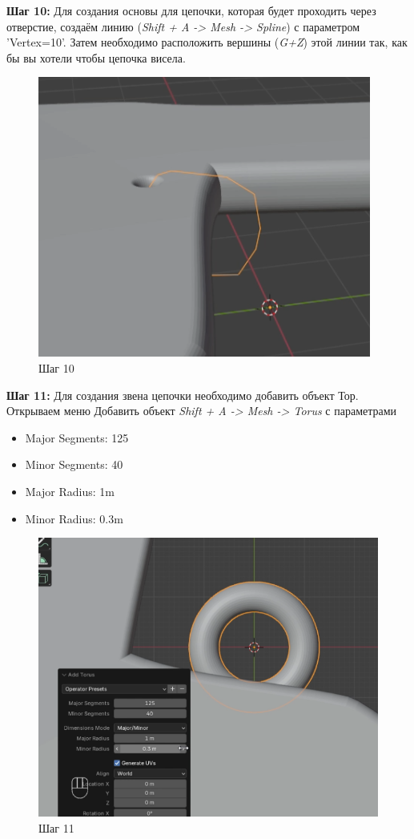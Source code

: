 \documentclass[areasetadvanced]{scrartcl}
\begin{document}
\par \textbf{Шаг 10:} Для создания основы для цепочки, которая будет проходить через отверстие, создаём линию (\textit{Shift + A -> Mesh ->  Spline}) с параметром 'Vertex=10'. Затем необходимо расположить вершины (\textit{G+Z}) этой линии так, как бы вы хотели чтобы цепочка висела.
\begin{figure}[H]
    \label{4} 
    \centering
    \includegraphics[width=0.8\linewidth]{dino/10.png}
    \caption{Шаг 10}
\end{figure}

\par \textbf{Шаг 11:} Для создания звена цепочки необходимо добавить объект Тор. Открываем меню Добавить объект \textit{Shift + A -> Mesh -> Torus} с параметрами
\begin{itemize}
    \item Major Segments: 125
    \item Minor Segments: 40
    \item Major Radius: 1m
    \item Minor Radius: 0.3m
\end{itemize}

\begin{figure}[H]
    \label{4} 
    \centering
    \includegraphics[width=0.8\linewidth]{dino/11.png}
    \caption{Шаг 11}
\end{figure}
\end{document}

